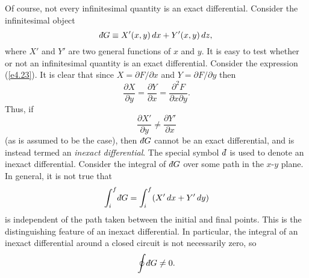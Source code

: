 Of course, not every infinitesimal quantity is an exact differential. Consider
the infinitesimal object
\begin{equation}
\dbar G \equiv X'(x,y)\, dx + Y'(x,y)\, dz,\label{e4.26}
\end{equation}
where $X'$ and $Y'$ are two
general functions of $x$ and $y$. It is easy to test whether or not
an infinitesimal quantity is an exact differential. Consider the expression 
(\ref{e4.23}).
It is clear that since $X= \partial F/\partial x$ and $Y=\partial F/\partial y$
then
\begin{equation}
\frac{\partial X}{\partial y} = \frac{\partial Y}{\partial x}= \frac{\partial^2 F}
{\partial x \partial y}.
\end{equation}
Thus,
if
\begin{equation}
\frac{\partial X'}{\partial y} \neq \frac{\partial Y'}{\partial x}
\end{equation}
(as is assumed to be the case), then $\,\dbar G$ cannot be an exact differential, and
is instead termed an {\em inexact differential}. 
The special symbol $\,\dbar$ is used to denote an inexact differential.
Consider the integral of
$\,\dbar G$ over some path in the $x$-$y$ plane. In general, it is not true
that
\begin{equation}
\int_i^f \dbar G = \int_i^f (X'\, dx + Y' \,dy)
\end{equation}
is independent of the  path taken between the initial and final points.
This is the distinguishing feature of an inexact differential. In particular,
the integral of an inexact differential around a closed circuit is not necessarily
zero, so
\begin{equation}
\oint \dbar G \neq 0.
\end{equation}

